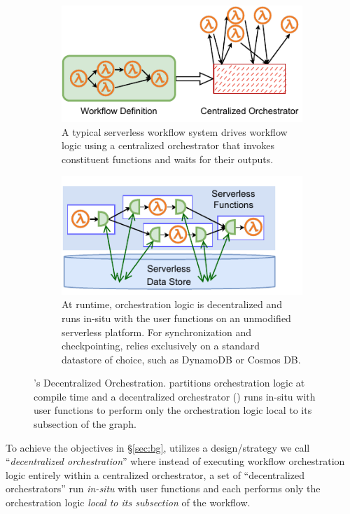 \begin{figure}[t]
\begin{subfigure}[t]{0.8\textwidth}
	\end{subfigure}
	\begin{subfigure}[b]{\columnwidth}
		\centering
		\includegraphics[width=0.8\columnwidth]{figures/unum-arch-centralized.pdf}
		\caption{A typical serverless workflow system drives workflow logic
			using a centralized orchestrator that invokes constituent
			functions and waits for their outputs.}
		\label{fig:arch:centralized}
	\end{subfigure}
	\hfill
	\begin{subfigure}[b]{\columnwidth}
		\centering
		\includegraphics[width=.7\columnwidth]{figures/unum-arch-runtime.pdf}
		\caption{At runtime, \name{} orchestration logic is decentralized and
			runs in-situ with the user functions on an unmodified serverless
			platform. For synchronization and checkpointing,
			\name{} relies exclusively on a standard datastore of choice, such
			as DynamoDB or Cosmos DB.}
		\label{fig:arch:unum-runtime}
	\end{subfigure}
	\caption{\name{}'s Decentralized Orchestration. \name{} partitions
	orchestration logic at compile time and a decentralized orchestrator
	(\deorc{}) runs in-situ with user functions to perform only the
	orchestration logic local to its subsection of the graph.}
	\label{fig:arch}
\end{figure}

To achieve the objectives in \S\ref{sec:bg}, \name{} utilizes a
design/strategy we call ``\emph{decentralized orchestration}'' where instead
of executing workflow orchestration logic entirely within a centralized
orchestrator, a set of ``decentralized orchestrators'' run \emph{in-situ} with
user functions and each performs only the orchestration logic \emph{local to
its subsection} of the workflow.

